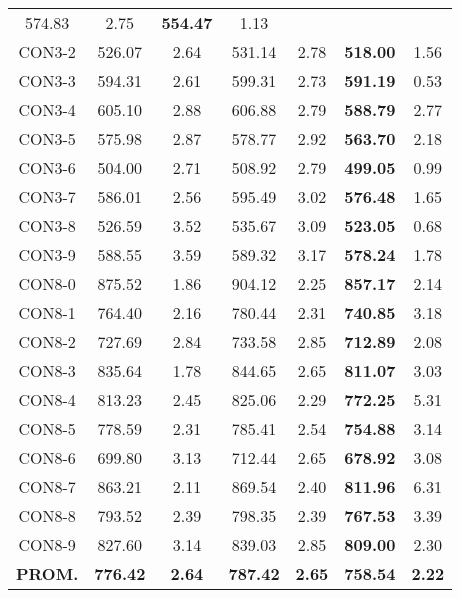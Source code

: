 \begin{table}[ht]
\begin{tabular}{c c c c c c c}
574.83 & 2.75 & \bf{554.47} & 
1.13\\CON3-2 & 526.07 & 2.64 & 
531.14 & 2.78 & \bf{518.00} & 
1.56\\CON3-3 & 594.31 & 2.61 & 
599.31 & 2.73 & \bf{591.19} & 
0.53\\CON3-4 & 605.10 & 2.88 & 
606.88 & 2.79 & \bf{588.79} & 
2.77\\CON3-5 & 575.98 & 2.87 & 
578.77 & 2.92 & \bf{563.70} & 
2.18\\CON3-6 & 504.00 & 2.71 & 
508.92 & 2.79 & \bf{499.05} & 
0.99\\CON3-7 & 586.01 & 2.56 & 
595.49 & 3.02 & \bf{576.48} & 
1.65\\CON3-8 & 526.59 & 3.52 & 
535.67 & 3.09 & \bf{523.05} & 
0.68\\CON3-9 & 588.55 & 3.59 & 
589.32 & 3.17 & \bf{578.24} & 
1.78\\CON8-0 & 875.52 & 1.86 & 
904.12 & 2.25 & \bf{857.17} & 
2.14\\CON8-1 & 764.40 & 2.16 & 
780.44 & 2.31 & \bf{740.85} & 
3.18\\CON8-2 & 727.69 & 2.84 & 
733.58 & 2.85 & \bf{712.89} & 
2.08\\CON8-3 & 835.64 & 1.78 & 
844.65 & 2.65 & \bf{811.07} & 
3.03\\CON8-4 & 813.23 & 2.45 & 
825.06 & 2.29 & \bf{772.25} & 
5.31\\CON8-5 & 778.59 & 2.31 & 
785.41 & 2.54 & \bf{754.88} & 
3.14\\CON8-6 & 699.80 & 3.13 & 
712.44 & 2.65 & \bf{678.92} & 
3.08\\CON8-7 & 863.21 & 2.11 & 
869.54 & 2.40 & \bf{811.96} & 
6.31\\CON8-8 & 793.52 & 2.39 & 
798.35 & 2.39 & \bf{767.53} & 
3.39\\CON8-9 & 827.60 & 3.14 & 
839.03 & 2.85 & \bf{809.00} & 
2.30\\\bf{PROM.} & 
\bf{776.42} & \bf{2.64} & \bf{787.42} & \bf{2.65} & \bf{758.54} & \bf{2.22}\\[1ex]\hline
\end{tabular}
\label{table:nonlin}
\end{table} \clearpage
